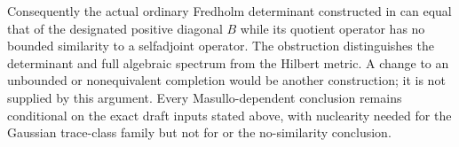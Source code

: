 Consequently the actual ordinary Fredholm determinant constructed in  can equal that of the designated positive diagonal $B$ while its quotient operator has no bounded similarity to a selfadjoint operator. The obstruction distinguishes the determinant and full algebraic spectrum from the Hilbert metric. A change to an unbounded or nonequivalent completion would be another construction; it is not supplied by this argument. Every Masullo-dependent conclusion remains conditional on the exact draft inputs stated above, with nuclearity needed for the Gaussian trace-class family but not for  or the no-similarity conclusion.
